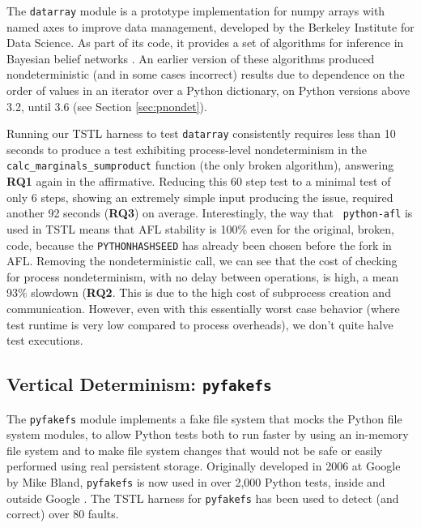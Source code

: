{The {\tt datarray} module \cite{datarray} is a prototype
implementation for numpy arrays with named axes to improve data
management, developed by the Berkeley Institute for Data Science.  As part of its code, it provides a set of algorithms for
inference in
Bayesian belief networks \cite{russell2016artificial}.  An earlier
version of these algorithms produced nondeterministic (and in some
cases incorrect) results due to dependence on the order of values in
an iterator over a Python dictionary, on Python versions above 3.2,
until 3.6 (see Section \ref{sec:pnondet}).  

Running our TSTL
harness to test {\tt datarray} consistently requires less than 10 seconds to produce a test exhibiting process-level nondeterminism in
the {\tt calc\_marginals\_sumproduct} function (the only broken
algorithm), answering {\bf RQ1} again in the affirmative.  Reducing this 60 step test to a minimal test of only 6 steps,
showing an extremely simple input producing the issue, 
required another 92 seconds ({\bf RQ3}) on average.  Interestingly, the way that {\tt
  python-afl} is used in TSTL means that AFL stability is 100\% even
for the original, broken, code,
because the {\tt PYTHONHASHSEED} has already been chosen before the
fork in AFL.  Removing the nondeterministic call, we can see that the cost of
checking for process nondeterminism, with no delay between operations,
is high, a mean 93\% slowdown ({\bf RQ2}.  This is due to the high cost of subprocess
creation and communication. However, even with this essentially worst
case behavior (where test runtime is very low compared to process overheads),
we don't quite halve test executions.

\subsection {Vertical Determinism: {\tt pyfakefs}}

The {\tt pyfakefs} \cite{pyfakefs} module implements a fake file
system that mocks the Python file system modules, to allow Python
tests both to run faster by using an in-memory file system and to make
file system changes that would not be safe or easily performed using
real persistent storage.  Originally developed in 2006 at Google by
Mike Bland, {\tt pyfakefs} is now used in over 2,000 Python tests,
inside and outside Google \cite{pyfakefs}.
The TSTL harness for {\tt pyfakefs} has been used to detect (and
correct) over 80 faults.

}
